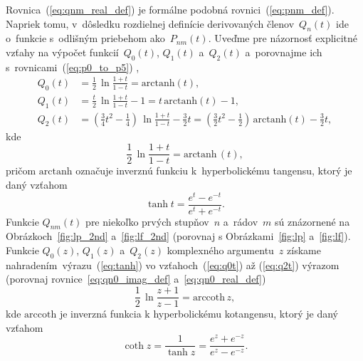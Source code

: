 \documentclass[a4paper,12pt]{book}
\begin{document}
Rovnica~(\ref{eq:qnm_real_def}) je formálne podobná rovnici~(\ref{eq:pnm_def}).  
Napriek tomu, v~dôsledku rozdielnej definície derivovaných členov~$Q_n(t)$ ide 
o~funkcie s~odlišným priebehom ako~$P_{nm}(t)$.  Uveďme pre názornosť 
explicitné vzťahy na výpočet funkcií~$Q_0\left( t \right)$, $Q_1\left( 
t \right)$ a~$Q_2\left( t \right)$ a~porovnajme ich 
s~rovnicami~(\ref{eq:p0_to_p5})
\parencite{MoritzPhysicalGeodesy},
%
\begin{align}
\label{eq:q0t}
Q_0(t) &= \frac{1}{2} \, \ln\frac{1 + t}{1 - t} = \mathrm{arctanh}(t){,}\\
%
\label{eq:q1t}
Q_1(t) &= \frac{t}{2} \, \ln\frac{1 + t}{1 - t} - 1 = t \, \mathrm{arctanh}(t)- 
 1{,}\\
%
\label{eq:q2t}
Q_2(t) &= \left( \frac{3}{4} t^2 - \frac{1}{4} \right) \, \ln\frac{1 + t}{1 
- t} - \frac{3}{2}t = \left( \frac{3}{2} t^2 - \frac{1}{2} \right) \, 
\mathrm{arctanh}(t) - \frac{3}{2}t{,}
\end{align}
%
kde
%
\begin{equation}
\label{eq:tanh}
\frac{1}{2} \, \ln \frac{1 + t}{1 - t} = \mathrm{arctanh} \, (t){,}
\end{equation}
%
pričom $\mathrm{arctanh}$ označuje inverznú funkciu k~hyperbolickému tangensu, 
ktorý je daný vzťahom \parencite{Gradshteyn2007}
%
\begin{equation}
\tanh t = \frac{e^t - e^{-t}}{e^t + e^{-t}}{.}
\end{equation}
%
Funkcie $Q_{nm}(t)$ pre niekoľko prvých stupňov~$n$ a~rádov~$m$ sú znázornené 
na Obrázkoch~\ref{fig:lp_2nd} a~\ref{fig:lf_2nd} (porovnaj 
s Obrázkami~\ref{fig:lp} a~\ref{fig:lf}).  Funkcie $Q_0\left( z \right)$, 
$Q_1\left( z \right)$ a~$Q_2\left( z \right)$ komplexného argumentu~$z$ získame 
nahradením~výrazu~(\ref{eq:tanh}) vo vzťahoch~(\ref{eq:q0t}) až (\ref{eq:q2t}) 
výrazom (porovnaj rovnice~\ref{eq:qn0_imag_def} a~\ref{eq:qn0_real_def})
%
\begin{equation}
\label{eq:arccoth}
\frac{1}{2} \, \ln \frac{z + 1}{z - 1} = \mathrm{arccoth} \, z{,}
\end{equation}
%
kde $\mathrm{arccoth}$ je inverzná funkcia k hyperbolickému kotangensu, ktorý 
je daný vzťahom \parencite{Gradshteyn2007}
%
\begin{equation}
\coth z = \frac{1}{\tanh z} =  \frac{e^z + e^{-z}}{e^z - e^{-z}}{.}
\end{equation}
\end{document}
